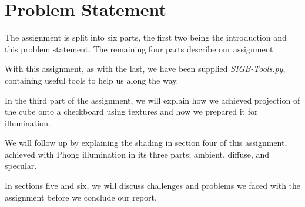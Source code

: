 \section{Problem Statement}
The assignment is split into six parts, the first two being the introduction and this problem statement. The remaining four parts describe our assignment.\newline

With this assignment, as with the last, we have been supplied \emph{SIGB-Tools.py}, containing useful tools to help us along the way.\newline

In the third part of the assignment, we will explain how we achieved projection of the cube onto a checkboard using textures and how we prepared it for illumination.\newline

We will follow up by explaining the shading in section four of this assignment, achieved with Phong illumination in its three parts; ambient, diffuse, and specular.\newline

In sections five and six, we will discuss challenges and problems we faced with the assignment before we conclude our report.